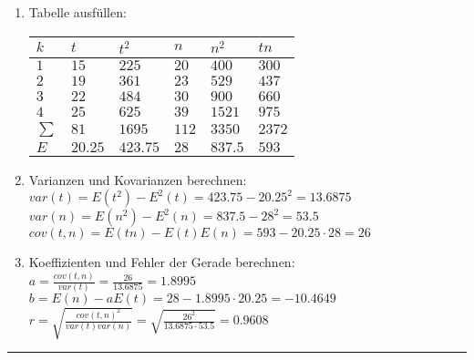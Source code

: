 \begin{minipage}{0.49\textwidth}
	\begin{enumerate}
		\item Tabelle ausfüllen:\\
		\begin{tabular}{|l||l|l||l|l||l|}
			\hline
			\textbf{$k$} & \textbf{$t$} & \textbf{$t^2$} & \textbf{$n$} &
			\textbf{$n^2$} & \textbf{$tn$} \\
			\hline \hline
			$1$ & $15$ & $225$ & $20$ & $400$ & $300$ \\
			\hline
			$2$ & $19$ & $361$ & $23$ & $529$ &	$437$\\
			\hline
			$3$ & $22$ & $484$ & $30$ & $900$ &	$660$\\
			\hline
			$4$ & $25$ & $625$ & $39$ & $1521$ & $975$\\
			\hline
			\hline
			$\sum$ & $81$ & $1695$ & $112$ & $3350$ & $2372$ \\
			\hline 
			$E$ & $20.25$ & $423.75$ & $28$ & $837.5$ & $593$ \\
			\hline
		\end{tabular}
		\item Varianzen und Kovarianzen berechnen:\\
		$var(t) = E(t^2) - E^2(t) = 423.75-20.25^2 = 13.6875$\\
		$var(n) = E(n^2) - E^2(n) = 837.5 - 28^2 = 53.5$\\
		$cov(t, n) = E(tn) - E(t)E(n) = 593 - 20.25 \cdot 28 = 26$ 
		\item Koeffizienten und Fehler der Gerade berechnen:\\
		$a = \frac{cov(t, n)}{var(t)} = \frac{26}{13.6875} = 1.8995$\\
		$b = E(n) - aE(t) = 28 - 1.8995\cdot 20.25 = -10.4649$\\
		$r = \sqrt{\frac{cov(t, n)^{2}}{var(t) var(n)}} = \sqrt{\frac{26^2}{13.6875\cdot 53.5}} = 0.9608$	
	\end{enumerate}
\end{minipage}




\vspace{.2cm}
\hrule

